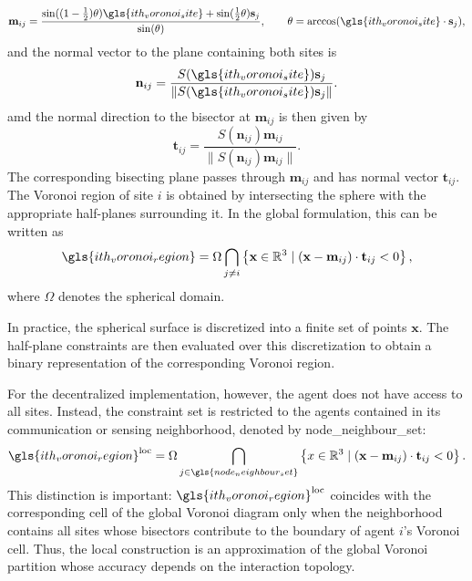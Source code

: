 \begin{equation}
\mathbf{m}_{ij} =
\frac{
\sin((1-\frac{1}{2})\theta)\gls{ith_voronoi_site}
+
\sin(\frac{1}{2}\theta)\mathbf{s}_j
}
{\sin(\theta)},
\qquad
\theta = \arccos(\gls{ith_voronoi_site} \cdot \mathbf{s}_j),
\end{equation}
and the normal vector to the plane containing both sites is
\begin{equation}
\mathbf{n}_{ij} =
\frac{S(\gls{ith_voronoi_site}) \mathbf{s}_j}
{\|S(\gls{ith_voronoi_site}) \mathbf{s}_j\|}.
\end{equation}
amd the normal direction to the bisector at $\mathbf{m}_{ij}$ is then given by
\begin{equation}
\mathbf{t}_{ij} =
\frac{S(\mathbf{n}_{ij}) \mathbf{m}_{ij}}
{\|S(\mathbf{n}_{ij}) \mathbf{m}_{ij}\|}.
\end{equation}
The corresponding bisecting plane passes through $\mathbf{m}_{ij}$ and has normal vector $\mathbf{t}_{ij}$. The Voronoi region of site $i$ is obtained by intersecting the sphere with the appropriate half-planes surrounding it. In the global formulation, this can be written as
\begin{equation}
\gls{ith_voronoi_region}
=
\Omega
\bigcap_{j \neq i}
\left\{
\mathbf{x}\in\mathbb{R}^3
\mid
(\mathbf{x}-\mathbf{m}_{ij})\cdot \mathbf{t}_{ij} < 0
\right\},
\label{eq:half_plane_voronoi_calculation}
\end{equation}
where $\Omega$ denotes the spherical domain.

In practice, the spherical surface is discretized into a finite set of points $\mathbf{x}$. The half-plane constraints are then evaluated over this discretization to obtain a binary representation of the corresponding Voronoi region.

For the decentralized implementation, however, the agent does not have access to all sites. Instead, the constraint set is restricted to the agents contained in its communication or sensing neighborhood, denoted by \gls{node_neighbour_set}:
\begin{equation}
\gls{ith_voronoi_region}^{\mathrm{loc}}
=
\Omega
\bigcap_{j \in \gls{node_neighbour_set}}
\left\{
x\in\mathbb{R}^3
\mid
(\mathbf{x}-\mathbf{m}_{ij})\cdot \mathbf{t}_{ij} < 0
\right\}.
\end{equation}
This distinction is important: $\gls{ith_voronoi_region}^{\mathrm{loc}}$ coincides with the corresponding cell of the global Voronoi diagram only when the neighborhood contains all sites whose bisectors contribute to the boundary of agent $i$'s Voronoi cell. Thus, the local construction is an approximation of the global Voronoi partition whose accuracy depends on the interaction topology.


